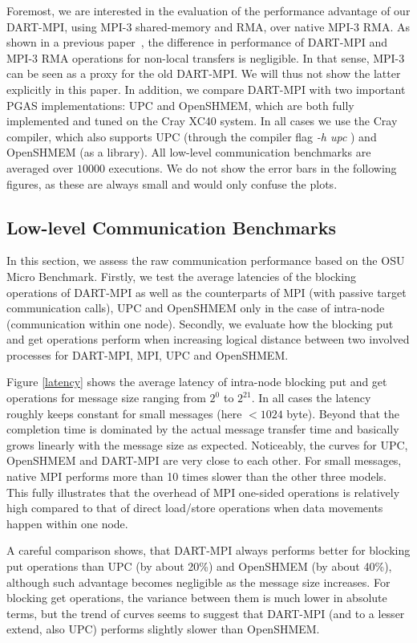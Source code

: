 \documentclass{llncs}
\newcommand{\MPI}[1]{\mbox{MPI-#1}\xspace}
\begin{document}
{Foremost, we are interested in the evaluation of the performance advantage of
our DART-MPI, using \MPI3 shared-memory and RMA, over native \MPI3
RMA. As shown in a previous paper~\cite{dart-mpi}, the
difference in performance of DART-MPI and MPI-3 RMA operations for non-local
transfers is negligible. In that sense, MPI-3 can be seen as a proxy
for the old DART-MPI. We will thus not show the latter explicitly in this paper.
In addition, we compare \mbox{DART-MPI} with two important PGAS implementations: UPC and OpenSHMEM, 
which are both fully implemented and tuned on the Cray XC40 system. 
In all cases we use the Cray compiler, which also supports UPC
(through the compiler flag \textit{-h upc} ) and OpenSHMEM (as a
library). 
All low-level communication benchmarks are averaged over $10000$ executions.
We do not show the error bars in the following figures, as these
are always small and would only confuse the plots.

\subsection{Low-level Communication Benchmarks}
In this section, we assess the raw communication performance based on the OSU Micro Benchmark\cite{osu_benchmark}.
Firstly, we test the average latencies of the blocking operations of \mbox{DART-MPI} 
as well as the counterparts of MPI (with passive target communication calls), UPC and OpenSHMEM\cite{openshmem} only in the case of intra-node (communication within one node).
Secondly, we evaluate how the blocking put and get operations perform when increasing
logical distance between two involved processes for DART-MPI, MPI, UPC and OpenSHMEM.

Figure \ref{latency} shows the average latency of intra-node blocking
put and get operations for message size ranging from $2^0$ to
$2^{21}$. In all cases the latency roughly keeps constant for small
messages (here $< 1024$ byte). Beyond that the completion time is
dominated by the actual message transfer time and basically grows
linearly with the message size as expected. Noticeably, the curves for
UPC, OpenSHMEM and DART-MPI are very close to each other. For small
messages, native MPI performs more than 10 times slower than the other three
models. This fully illustrates that the overhead of MPI one-sided
operations is relatively high compared to that of direct load/store operations
when data movements happen within one node.

A careful comparison shows, that DART-MPI always performs better for
blocking put operations than UPC (by about 20\%) and OpenSHMEM (by
about 40\%), although such advantage becomes negligible as the message
size increases. For blocking get operations, the variance between
them is much lower in absolute terms, but the trend of curves seems to
suggest that DART-MPI (and to a lesser extend, also UPC) performs slightly
slower than OpenSHMEM.

}
\end{document}
